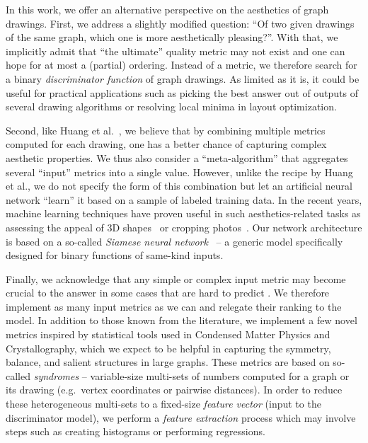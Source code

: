 In this work, we offer an alternative perspective on the aesthetics of graph drawings.  First, we address a slightly
modified question: \enquote{Of two given drawings of the same graph, which one is more aesthetically pleasing?}.  With
that, we implicitly admit that \enquote{the ultimate} quality metric may not exist and one can hope for at most a
(partial) ordering.  Instead of a metric, we therefore search for a binary \emph{discriminator function} of graph
drawings.  As limited as it is, it could be useful for practical applications such as picking the best answer out of
outputs of several drawing algorithms or resolving local minima in layout optimization.

Second, like Huang et al.~\cite{Huang2013}, we believe that by combining multiple metrics computed for each drawing, one
has a better chance of capturing complex aesthetic properties.  We thus also consider a \enquote{meta-algorithm} that
aggregates several \enquote{input} metrics into a single value.  However, unlike the recipe by Huang et al., we do not
specify the form of this combination  but let an artificial neural network \enquote{learn} it
based on a sample of labeled training data.  In the recent years, machine learning techniques have proven useful in such
aesthetics-related tasks as assessing the appeal of 3D shapes~\cite{DevLL16} or cropping photos~\cite{Nishiyama09}.  Our
network architecture is based on a so-called \emph{Siamese neural network}~\cite{Bromley1994} -- a generic model
specifically designed for binary functions of same-kind inputs.

Finally, we acknowledge that any simple or complex input metric may become crucial to the answer in some cases that are
hard to predict .  We therefore implement as many input metrics as we can and relegate their
ranking to the model.  In addition to those known from the literature, we implement a few novel metrics inspired by
statistical tools used in Condensed Matter Physics and Crystallography, which we expect to be helpful in capturing the
symmetry, balance, and salient structures in large graphs.  These metrics are based on so-called \emph{syndromes} --
variable-size multi-sets of numbers computed for a graph or its drawing (e.g.~vertex coordinates or pairwise distances).
In order to reduce these heterogeneous multi-sets to a fixed-size \emph{feature vector} (input to the discriminator
model), we perform a \emph{feature extraction} process which may involve steps such as creating histograms or performing
regressions.

